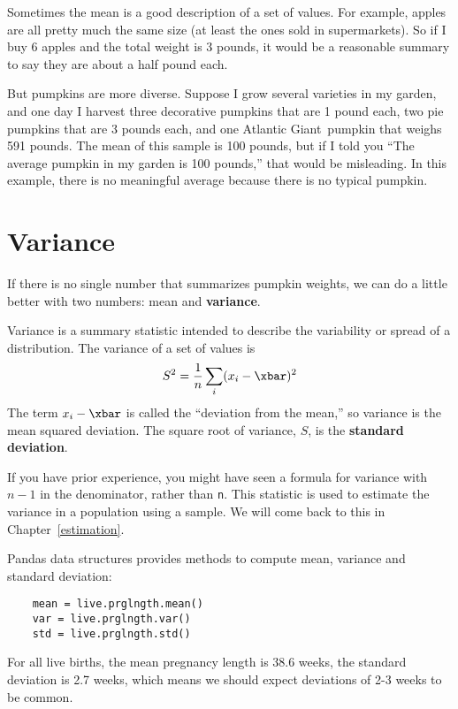 \documentclass[12pt]{book}
\begin{document}
Sometimes the mean is a good description of a set of values.  For
example, apples are all pretty much the same size (at least the ones
sold in supermarkets).  So if I buy 6 apples and the total weight is 3
pounds, it would be a reasonable summary to say they are about a half
pound each.

But pumpkins are more diverse.  Suppose I grow several varieties in my
garden, and one day I harvest three decorative pumpkins that are 1
pound each, two pie pumpkins that are 3 pounds each, and one Atlantic
Giant\textregistered~pumpkin that weighs 591 pounds.  The mean of this
sample is 100 pounds, but if I told you ``The average pumpkin in my
garden is 100 pounds,'' that would be misleading.  In this example,
there is no meaningful average because there is no typical pumpkin.



\section{Variance}

If there is no single number that summarizes pumpkin weights,
we can do a little better with two numbers: mean and {\bf variance}.

Variance is a summary statistic intended to describe the variability
or spread of a distribution.  The variance of a set of values is
%
\[ S^2 = \frac{1}{n} \sum_i (x_i - \xbar)^2 \]
%
The term $x_i - \xbar$ is called the ``deviation from the mean,'' so
variance is the mean squared deviation.  The square root of variance,
$S$, is the {\bf standard deviation}.  

If you have prior experience, you might have seen a formula for
variance with $n-1$ in the denominator, rather than {\tt n}.  This
statistic is used to estimate the variance in a population using a
sample.  We will come back to this in Chapter~\ref{estimation}.

Pandas data structures provides methods to compute mean, variance and
standard deviation:

\begin{verbatim}
    mean = live.prglngth.mean()
    var = live.prglngth.var()
    std = live.prglngth.std()
\end{verbatim}

For all live births, the mean pregnancy length is 38.6 weeks, the
standard deviation is 2.7 weeks, which means we should expect
deviations of 2-3 weeks to be common.
\end{document}
